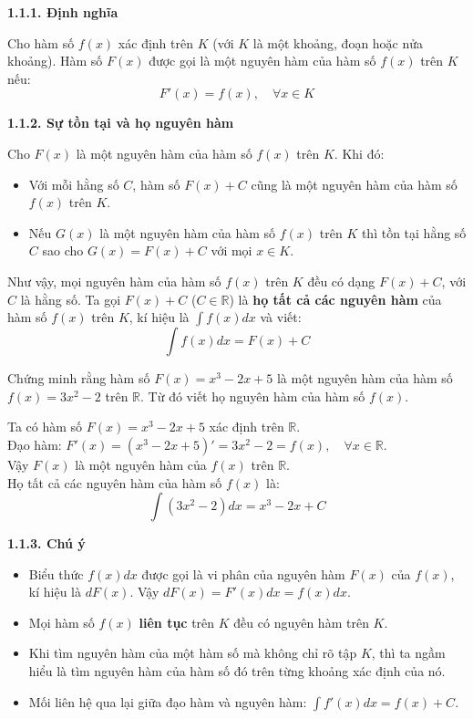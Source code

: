 \documentclass[12pt]{article}
\begin{document}
	\textbf{1.1.1. Định nghĩa}
	
	Cho hàm số $f(x)$ xác định trên $K$ (với $K$ là một khoảng, đoạn hoặc nửa khoảng). Hàm số $F(x)$ được gọi là một nguyên hàm của hàm số $f(x)$ trên $K$ nếu:
	$$F'(x) = f(x), \quad \forall x \in K$$
	
	\noindent \textbf{1.1.2. Sự tồn tại và họ nguyên hàm}
	
	Cho $F(x)$ là một nguyên hàm của hàm số $f(x)$ trên $K$. Khi đó:
	\begin{itemize}
		\item Với mỗi hằng số $C$, hàm số $F(x) + C$ cũng là một nguyên hàm của hàm số $f(x)$ trên $K$.
		\item Nếu $G(x)$ là một nguyên hàm của hàm số $f(x)$ trên $K$ thì tồn tại hằng số $C$ sao cho $G(x) = F(x) + C$ với mọi $x \in K$.
	\end{itemize}
	
	Như vậy, mọi nguyên hàm của hàm số $f(x)$ trên $K$ đều có dạng $F(x) + C$, với $C$ là hằng số. Ta gọi $F(x) + C$ ($C \in \mathbb{R}$) là \textbf{họ tất cả các nguyên hàm} của hàm số $f(x)$ trên $K$, kí hiệu là $\int f(x)dx$ và viết:
	$$\int f(x)dx = F(x) + C$$
	
	\begin{vidu}[1]
		Chứng minh rằng hàm số $F(x) = x^3 - 2x + 5$ là một nguyên hàm của hàm số $f(x) = 3x^2 - 2$ trên $\mathbb{R}$. Từ đó viết họ nguyên hàm của hàm số $f(x)$.
	\end{vidu}
	
	\begin{loigiai}
		Ta có hàm số $F(x) = x^3 - 2x + 5$ xác định trên $\mathbb{R}$.\\
		Đạo hàm: $F'(x) = (x^3 - 2x + 5)' = 3x^2 - 2 = f(x), \quad \forall x \in \mathbb{R}$.\\
		Vậy $F(x)$ là một nguyên hàm của $f(x)$ trên $\mathbb{R}$.\\
		Họ tất cả các nguyên hàm của hàm số $f(x)$ là:
		$$\int (3x^2 - 2)dx = x^3 - 2x + C$$
	\end{loigiai}
	
	\noindent \textbf{1.1.3. Chú ý}
	\begin{itemize}
		\item Biểu thức $f(x)dx$ được gọi là vi phân của nguyên hàm $F(x)$ của $f(x)$, kí hiệu là $dF(x)$. 
		Vậy $dF(x) = F'(x)dx = f(x)dx$.
		\item Mọi hàm số $f(x)$ \textbf{liên tục} trên $K$ đều có nguyên hàm trên $K$.
		\item Khi tìm nguyên hàm của một hàm số mà không chỉ rõ tập $K$, thì ta ngầm hiểu là tìm nguyên hàm của hàm số đó trên từng khoảng xác định của nó.
		\item Mối liên hệ qua lại giữa đạo hàm và nguyên hàm: $\int f'(x)dx = f(x) + C$.
	\end{itemize}
	
\end{document}
